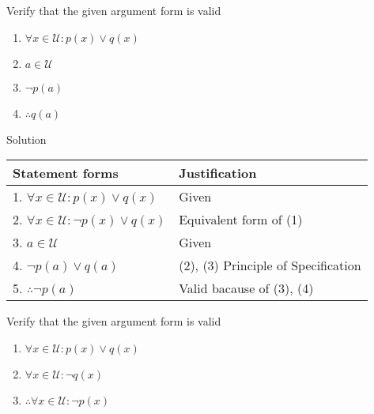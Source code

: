 \newpage
\begin{longfbox}
    \begin{bt} \label{pro:practice2.30}
        Verify that the given argument form is valid
        \begin{enumerate}
            \item[] $\forall x \in \mathcal U: p(x) \lor q(x)$
            \item[] $a \in \mathcal U$
            \item[] $\neg p(a)$
            \item[] $\therefore q(a)$
        \end{enumerate}
    \end{bt}
\end{longfbox}

Solution
\begin{table}[hbt!]
    \centering
    \begin{tabular}{|l | l|} 
    \hline
    Statement forms & Justification\\ [0.5ex] 
    \hline
        1. $\forall x \in \mathcal U: p(x) \lor q(x)$ & Given \\
        2. $\forall x \in \mathcal U: \neg p(x) \lor q(x)$ & Equivalent form of (1) \\
        3. $a \in \mathcal U$ & Given \\
        4. $\neg p(a) \lor q(a)$ & (2), (3) Principle of Specification \\
        5. $\therefore \neg p(a)$ & Valid bacause of (3), (4) \\
    \hline
    \end{tabular}
\end{table}

\begin{longfbox}
    \begin{bt} \label{pro:practice2.31}
        Verify that the given argument form is valid
        \begin{enumerate}
            \item[] $\forall x \in \mathcal U: p(x) \lor q(x)$
            \item[] $\forall x \in \mathcal U: \neg q(x)$
            \item[] $\therefore \forall x \in \mathcal U: \neg p(x)$
        \end{enumerate}
    \end{bt}
\end{longfbox}

